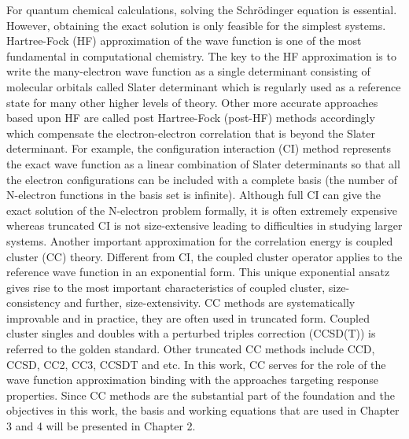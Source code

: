 For quantum chemical calculations, solving the Schr\"odinger equation is
essential. However, obtaining the exact solution is only feasible for the
simplest systems. Hartree-Fock (HF)\cite{Slater1951, Szabo2012} approximation
of the wave function is one of the most fundamental in computational chemistry.
The key to the HF approximation is to write the many-electron wave function as
a single determinant consisting of molecular orbitals called Slater determinant
which is regularly used as a reference state for many other higher levels of
theory. Other more accurate approaches based upon HF are called post
Hartree-Fock (post-HF) methods accordingly which compensate the
electron-electron correlation that is beyond the Slater determinant. For
example, the configuration interaction (CI) method\cite{Sherrill1999}
represents the exact wave function as a linear combination of Slater
determinants so that all the electron configurations can be included with a
complete basis (the number of N-electron functions in the basis set is
infinite). Although full CI can give the exact solution of the N-electron
problem formally, it is often extremely expensive whereas truncated CI is not
size-extensive leading to difficulties in studying larger systems. Another
important approximation for the correlation energy is coupled cluster (CC)
theory.\cite{Crawford2000} Different from CI, the coupled cluster operator
applies to the reference wave function in an exponential form. This unique
exponential ansatz gives rise to the most important characteristics of coupled
cluster, size-consistency and further, size-extensivity. CC methods are
systematically improvable and in practice, they are often used in truncated
form. Coupled cluster singles and doubles with a perturbed triples correction
(CCSD(T))\cite{Purvis1982} is referred to the golden standard. Other truncated
CC methods include CCD, CCSD, CC2,\cite{Christiansen1995} CC3,\cite{Koch1997}
CCSDT and etc. In this work, CC serves for the role of the wave function
approximation binding with the approaches targeting response properties. Since
CC methods are the substantial part of the foundation and the objectives in
this work, the basis and working equations that are used in Chapter 3 and 4
will be presented in Chapter 2. 

